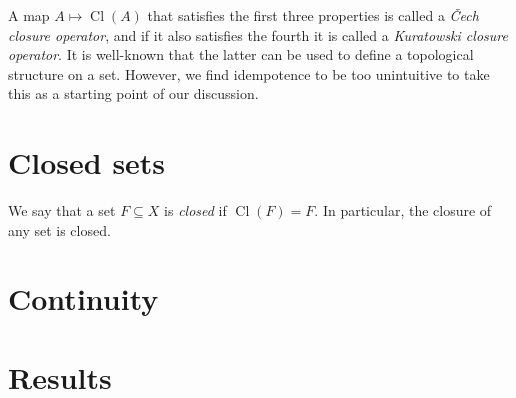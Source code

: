 \documentclass[article, a4paper, 11pt, oneside]{memoir}
\numberwithin{equation}{chapter}
\renewcommand{\closure}[1]{\operatorname{Cl}(#1)}
\begin{document}
A map $A \mapsto \closure{A}$ that satisfies the first three properties is called a \emph{\v{C}ech closure operator}, and if it also satisfies the fourth it is called a \emph{Kuratowski closure operator}. It is well-known that the latter can be used to define a topological structure on a set. However, we find idempotence to be too unintuitive to take this as a starting point of our discussion.


\section{Closed sets}

We say that a set $F \subseteq X$ is \emph{closed} if $\closure{F} = F$. In particular, the closure of any set is closed.


\section{Continuity}




\section{Results}


\nocite{*}

\printbibliography
\end{document}
